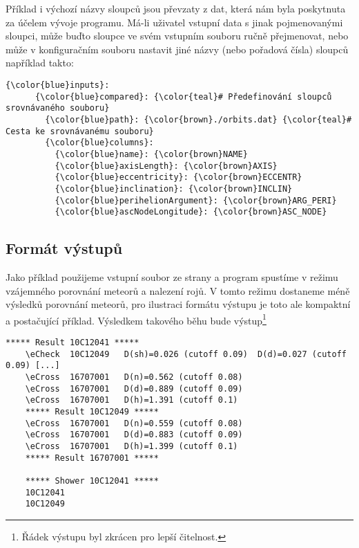 Příklad i výchozí názvy sloupců jsou převzaty z dat, která nám byla poskytnuta za účelem vývoje programu. Má-li uživatel vstupní data s jinak pojmenovanými sloupci, může buďto sloupce ve svém vstupním souboru ručně přejmenovat, nebo může v konfiguračním souboru nastavit jiné názvy (nebo pořadová čísla) sloupců například takto:
\begin{Verbatim}[commandchars=\\\{\},gobble=4,formatcom=\footnotesize,frame=lines,label=YAML]
    {\color{blue}inputs}:
      {\color{blue}compared}: {\color{teal}# Předefinování sloupců srovnávaného souboru}
        {\color{blue}path}: {\color{brown}./orbits.dat} {\color{teal}# Cesta ke srovnávanému souboru}
        {\color{blue}columns}:
          {\color{blue}name}: {\color{brown}NAME}
          {\color{blue}axisLength}: {\color{brown}AXIS}
          {\color{blue}eccentricity}: {\color{brown}ECCENTR}
          {\color{blue}inclination}: {\color{brown}INCLIN}
          {\color{blue}perihelionArgument}: {\color{brown}ARG_PERI}
          {\color{blue}ascNodeLongitude}: {\color{brown}ASC_NODE}
\end{Verbatim}

\subsection{Formát výstupů}%
Jako příklad použijeme vstupní soubor ze strany \pageref{code:practical:input} a program spustíme v režimu vzájemného porovnání meteorů a nalezení rojů. V tomto režimu dostaneme méně výsledků porovnání meteorů, pro ilustraci formátu výstupu je toto ale kompaktní a postačující příklad. Výsledkem takového běhu bude výstup\footnote{Řádek výstupu byl zkrácen pro lepší čitelnost.}
\begin{Verbatim}[commandchars=\\\{\},gobble=4,formatcom=\footnotesize,frame=lines,reflabel=code:practical:output]
    ***** Result 10C12041 *****
    \eCheck  10C12049   D(sh)=0.026 (cutoff 0.09)  D(d)=0.027 (cutoff 0.09) [...]
    \eCross  16707001   D(n)=0.562 (cutoff 0.08)
    \eCross  16707001   D(d)=0.889 (cutoff 0.09)
    \eCross  16707001   D(h)=1.391 (cutoff 0.1)
    ***** Result 10C12049 *****
    \eCross  16707001   D(n)=0.559 (cutoff 0.08)
    \eCross  16707001   D(d)=0.883 (cutoff 0.09)
    \eCross  16707001   D(h)=1.399 (cutoff 0.1)
    ***** Result 16707001 *****
    
    ***** Shower 10C12041 *****
    10C12041
    10C12049    
\end{Verbatim}

